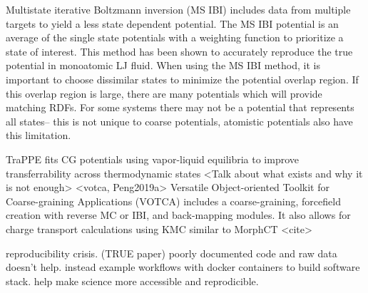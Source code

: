 Multistate iterative Boltzmann inversion (MS IBI) includes data from multiple targets to yield a less state dependent potential. \cite{Moore2014}
The MS IBI potential is an average of the single state potentials with a weighting function to prioritize a state of interest.
This method has been shown to accurately reproduce the true potential in monoatomic LJ fluid. 
When using the MS IBI method, it is important to choose dissimilar states to minimize the potential overlap region. If this overlap region is large, there are many potentials which will provide matching RDFs. For some systems there may not be a potential that represents all states-- this is not unique to coarse potentials, atomistic potentials also have this limitation.

TraPPE fits CG potentials using vapor-liquid equilibria to improve transferrability across thermodynamic states\cite{Maerzke2011}
<Talk about what exists and why it is not enough>
<votca, Peng2019a> 
Versatile Object-oriented Toolkit for Coarse-graining Applications (VOTCA) \cite{Ruhle2011b}
includes a coarse-graining, forcefield creation with reverse MC or IBI, and back-mapping modules. It also allows for charge transport calculations using KMC similar to MorphCT <cite>

reproducibility crisis.\cite{Cummings2019} \cite{Thompson2020} (TRUE paper) poorly documented code and raw data doesn't help. 
instead example workflows with docker containers to build software stack. help make science more accessible and reprodicible.

